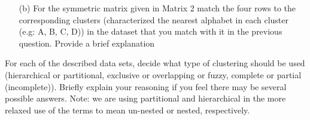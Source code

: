 \documentclass[11pt]{article}
\begin{document}
\begin{itemize}
\begin{enumerate}
  \item[(b)] For the symmetric matrix given in Matrix 2 match the four rows to the corresponding clusters (characterized the nearest alphabet in 
  each cluster (e.g: A, B, C, D)) in the dataset that you match with it in the previous question. Provide a brief explanation
%
%
%
%
%
\end{enumerate}
For each of the described data sets, decide what type of clustering should be used (hierarchical or partitional, exclusive or overlapping or fuzzy, complete or partial (incomplete)). Briefly explain your reasoning if you feel there may be several possible answers. Note: we are using partitional and hierarchical in the more relaxed use of the terms to mean un-nested or nested, respectively.


\end{itemize}
\end{document}
